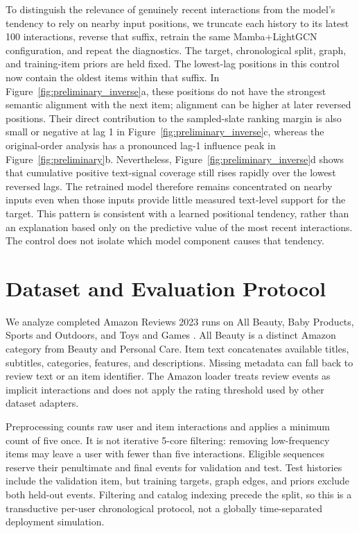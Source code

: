 \documentclass[11pt]{article}
\begin{document}
To distinguish the relevance of genuinely recent interactions from the model's tendency to rely on nearby input positions, we truncate each history to its latest 100 interactions, reverse that suffix, retrain the same Mamba+LightGCN configuration, and repeat the diagnostics. The target, chronological split, graph, and training-item priors are held fixed. The lowest-lag positions in this control now contain the oldest items within that suffix. In Figure~\ref{fig:preliminary_inverse}a, these positions do not have the strongest semantic alignment with the next item; alignment can be higher at later reversed positions. Their direct contribution to the sampled-slate ranking margin is also small or negative at lag 1 in Figure~\ref{fig:preliminary_inverse}c, whereas the original-order analysis has a pronounced lag-1 influence peak in Figure~\ref{fig:preliminary}b. Nevertheless, Figure~\ref{fig:preliminary_inverse}d shows that cumulative positive text-signal coverage still rises rapidly over the lowest reversed lags. The retrained model therefore remains concentrated on nearby inputs even when those inputs provide little measured text-level support for the target. This pattern is consistent with a learned positional tendency, rather than an explanation based only on the predictive value of the most recent interactions. The control does not isolate which model component causes that tendency.

\section{Dataset and Evaluation Protocol}
\label{app:dataset_protocol}
We analyze completed Amazon Reviews 2023 runs on All Beauty, Baby Products, Sports and Outdoors, and Toys and Games \citep{BLaIR}. All Beauty is a distinct Amazon category from Beauty and Personal Care. Item text concatenates available titles, subtitles, categories, features, and descriptions. Missing metadata can fall back to review text or an item identifier. The Amazon loader treats review events as implicit interactions and does not apply the rating threshold used by other dataset adapters.

Preprocessing counts raw user and item interactions and applies a minimum count of five once. It is not iterative 5-core filtering: removing low-frequency items may leave a user with fewer than five interactions. Eligible sequences reserve their penultimate and final events for validation and test. Test histories include the validation item, but training targets, graph edges, and priors exclude both held-out events. Filtering and catalog indexing precede the split, so this is a transductive per-user chronological protocol, not a globally time-separated deployment simulation.
\end{document}
